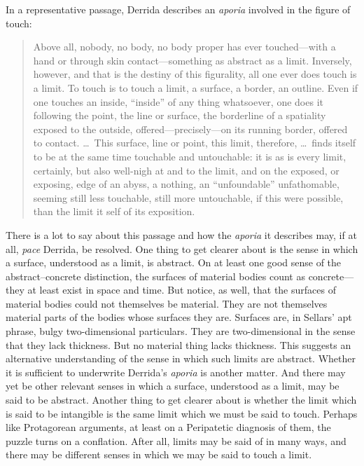 In a representative passage, Derrida describes an \emph{aporia} involved in the figure of touch:
\begin{quote}
	Above all, nobody, no body, no body proper has ever touched---with a hand or through skin contact---something as abstract as a limit. Inversely, however, and that is the destiny of this figurality, all one ever does touch is a limit. To touch is to touch a limit, a surface, a border, an outline. Even if one touches an inside, ``inside'' of any thing whatsoever, one does it following the point, the line or surface, the borderline of a spatiality exposed to the outside, offered---precisely---on its running border, offered to contact. \ldots\ This surface, line or point, this limit, therefore, \ldots\ finds itself to be at the same time touchable and untouchable: it is as is every limit, certainly, but also well-nigh at and to the limit, and on the exposed, or exposing, edge of an abyss, a nothing, an ``unfoundable'' unfathomable, seeming still less touchable, still more untouchable, if this were possible, than the limit it self of its exposition. \citep[103--4]{Derrida:2005aa}
\end{quote}
There is a lot to say about this passage and how the \emph{aporia} it describes may, if at all, \emph{pace} Derrida, be resolved. One thing to get clearer about is the sense in which a surface, understood as a limit, is abstract. On at least one good sense of the abstract--concrete distinction, the surfaces of material bodies count as concrete---they at least exist in space and time. But notice, as well, that the surfaces of material bodies could not themselves be material. They are not themselves material parts of the bodies whose surfaces they are. Surfaces are, in Sellars' \citeyearpar[\textsc{iv} 23]{Sellars:1956xp} apt phrase, bulgy two-dimensional particulars. They are two-dimensional in the sense that they lack thickness. But no material thing lacks thickness. This suggests an alternative understanding of the sense in which such limits are abstract. Whether it is sufficient to underwrite Derrida's \emph{aporia} is another matter. And there may yet be other relevant senses in which a surface, understood as a limit, may be said to be abstract. Another thing to get clearer about is whether the limit which is said to be intangible is the same limit which we must be said to touch. Perhaps like Protagorean arguments, at least on a Peripatetic diagnosis of them, the puzzle turns on a conflation. After all, limits may be said of in many ways, and there may be different senses in which we may be said to touch a limit.

